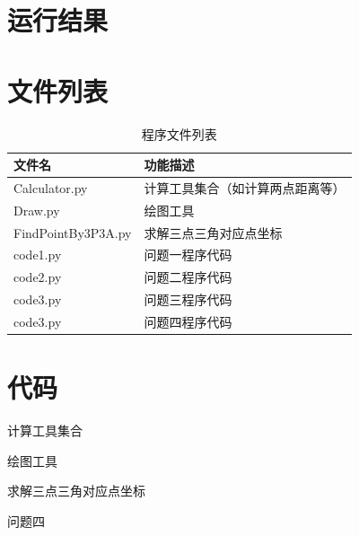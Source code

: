 \documentclass[withoutpreface,bwprint]{cumcmthesis} %
\begin{document}



\begin{appendices}

\section{运行结果}


\section{文件列表}
\begin{table}[H]
    \caption{程序文件列表}
    \centering
    \begin{tabularx}{\textwidth}{l X}
        \bottomrule
        文件名 & 功能描述 \\
        \midrule
        Calculator.py & 计算工具集合（如计算两点距离等） \\
        Draw.py & 绘图工具 \\
        FindPointBy3P3A.py & 求解三点三角对应点坐标 \\
        code1.py & 问题一程序代码 \\
        code2.py & 问题二程序代码 \\
        code3.py & 问题三程序代码 \\
        code3.py & 问题四程序代码 \\
        \bottomrule
    \end{tabularx}
    \label{tab:文件列表}
\end{table}

\section{代码}
计算工具集合

绘图工具

求解三点三角对应点坐标

问题四


\end{appendices}
\end{document}
